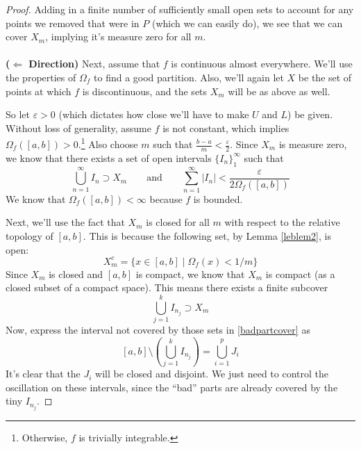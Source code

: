 \documentclass[12pt]{article}
\theoremstyle{plain}
\theoremstyle{definition}
\theoremstyle{remark}
\begin{document}
\begin{proof}
Adding in a finite number of sufficiently small open sets to account for any points we removed that were in $P$ (which we can easily do), we see that we can cover $X_m$, implying it's measure zero for all $m$.
\\
\\
\textbf{($\Leftarrow$ Direction)} Next, assume that $f$ is continuous almost everywhere. We'll use the properties of $\Omega_f$ to find a good partition. Also, we'll again let $X$ be the set of points at which $f$ is discontinuous, and the sets $X_m$ will be as above as well.

So let $\varepsilon>0$ (which dictates how close we'll have to make $U$ and $L$) be given. Without loss of generality, assume $f$ is not constant, which implies $\Omega_f([a,b]) > 0$.\footnote{Otherwise, $f$ is trivially integrable.} Also choose $m$ such that $\frac{b-a}{m}<\frac{\varepsilon}{2}$. Since $X_m$ is measure zero, we know that there exists a set of open intervals $\{I_n\}_1^\infty$ such that
\[ 
    \bigcup^\infty_{n=1} I_n \supset X_m \qquad  \text{and} \qquad
    \sum^\infty_{n=1} |I_n| < \frac{ \varepsilon}{2\Omega_f([a,b])}
\]
We know that $\Omega_f([a,b])<\infty$ because $f$ is bounded.

Next, we'll use the fact that $X_m$ is closed for all $m$ with respect to the relative topology of $[a,b]$. This is because the following set, by Lemma \ref{leblem2}, is open:
\[ 
    X_m^c = \{ x \in [a,b] \; | \; \Omega_f(x) < 1/m \}
\]
Since $X_m$ is closed and $[a,b]$ is compact, we know that $X_m$ is compact (as a closed subset of a compact space). This means there exists a finite subcover
\begin{equation}
    \label{badpartcover}
    \bigcup^k_{j=1} I_{n_j} \supset X_m
\end{equation}
Now, express the interval not covered by those sets in \ref{badpartcover} as 
\[ 
    [a,b] \setminus \left( \bigcup^k_{j=1} I_{n_j}\right)
    = \bigcup^p_{i=1} J_i 
\]
It's clear that the $J_i$ will be closed and disjoint. We just need to control the oscillation on these intervals, since the ``bad'' parts are already covered by the tiny $I_{n_j}$.


\end{proof}
\end{document}
